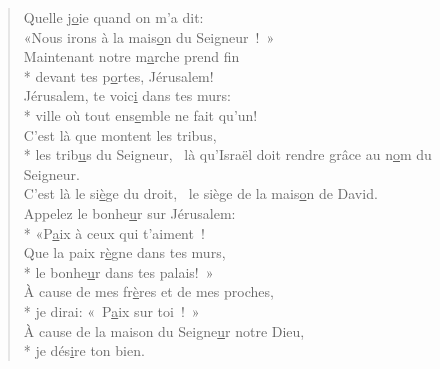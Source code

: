 
\begin{verse}
Quelle j\underline{o}ie quand on m’a dit: \\
«Nous irons à la mais\underline{o}n du Seigneur ! » \\

Maintenant notre m\underline{a}rche prend fin \\*
devant tes p\underline{o}rtes, Jérusalem! \\
Jérusalem, te voic\underline{i} dans tes murs: \\*
ville où tout ens\underline{e}mble ne fait qu’un! \\

C’est là que montent les tribus, \\*
les trib\underline{u}s du Seigneur,~\psalmstar
là qu’Israël doit rendre grâce
au n\underline{o}m du Seigneur. \\
C’est là le si\underline{è}ge du droit,~\psalmstar
le siège de la mais\underline{o}n de David. \\

Appelez le bonhe\underline{u}r sur Jérusalem: \\*
«P\underline{a}ix à ceux qui t’aiment ! \\
Que la paix r\underline{è}gne dans tes murs, \\*
le bonhe\underline{u}r dans tes palais! » \\

À cause de mes fr\underline{è}res et de mes proches, \\*
je dirai: « P\underline{a}ix sur toi ! » \\
À cause de la maison du Seigne\underline{u}r notre Dieu, \\*
je dés\underline{i}re ton bien. \\
\end{verse}

